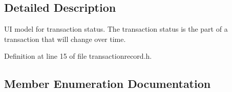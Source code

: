 \subsection{Detailed Description}
U\+I model for transaction status. The transaction status is the part of a transaction that will change over time. 

Definition at line 15 of file transactionrecord.\+h.



\subsection{Member Enumeration Documentation}
\hypertarget{class_transaction_status_aaa6cc19ca3509bbae72d0df1661f85cb}{}
